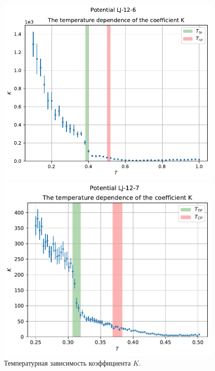 \documentclass[pdf,hyperref={unicode}]{beamer}
\begin{document}
\begin{frame}
\begin{columns}
\begin{column}{0.7\linewidth}
{\begin{figure}[h]
\begin{center}
\begin{minipage}[h]{0.45\linewidth}
\includegraphics[width=\textwidth, keepaspectratio]{plot_K_Potential LJ-12-6_1}
\end{minipage}
\begin{minipage}[h]{0.45\linewidth}
\includegraphics[width=\textwidth, keepaspectratio]{plot_K_Potential LJ-12-7_1}
\end{minipage}
\caption{Температурная зависимость коэффициента $K$.}
\label{risK}
\end{center}
\end{figure}
}
\end{column}


\end{columns}
\end{frame}
\end{document}
